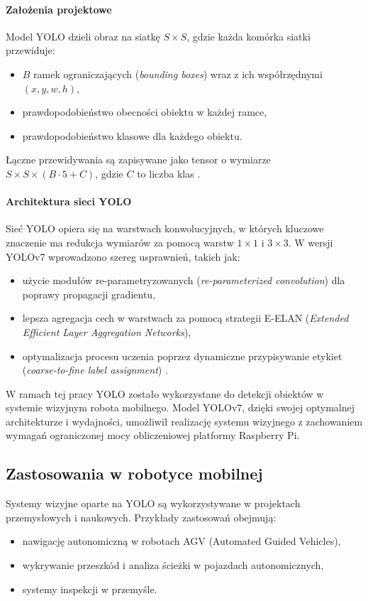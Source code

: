 \documentclass[a4paper,twoside,12pt]{book}
\begin{document}
\paragraph{Założenia projektowe}
Model YOLO dzieli obraz na siatkę \( S \times S \), gdzie każda komórka siatki przewiduje:
\begin{itemize}
    \item \( B \) ramek ograniczających (\textit{bounding boxes}) wraz z ich współrzędnymi \((x, y, w, h)\),
    \item prawdopodobieństwo obecności obiektu w każdej ramce,
    \item prawdopodobieństwo klasowe dla każdego obiektu.
\end{itemize}
Łączne przewidywania są zapisywane jako tensor o wymiarze \( S \times S \times (B \cdot 5 + C) \), gdzie \( C \) to liczba klas \cite{bib:redmon_yolo}.

\paragraph{Architektura sieci YOLO}
Sieć YOLO opiera się na warstwach konwolucyjnych, w których kluczowe znaczenie ma redukcja wymiarów za pomocą warstw \( 1 \times 1 \) i \( 3 \times 3 \). W wersji YOLOv7 wprowadzono szereg usprawnień, takich jak:
\begin{itemize}
    \item użycie modułów re-parametryzowanych (\textit{re-parameterized convolution}) dla poprawy propagacji gradientu,
    \item lepsza agregacja cech w warstwach za pomocą strategii E-ELAN (\textit{Extended Efficient Layer Aggregation Networks}),
    \item optymalizacja procesu uczenia poprzez dynamiczne przypisywanie etykiet (\textit{coarse-to-fine label assignment}) \cite{bib:wang_yolov7}.
\end{itemize}

W ramach tej pracy YOLO zostało wykorzystane do detekcji obiektów w systemie wizyjnym robota mobilnego. Model YOLOv7, dzięki swojej optymalnej architekturze i wydajności, umożliwił realizację systemu wizyjnego z zachowaniem wymagań ograniczonej mocy obliczeniowej platformy Raspberry Pi.

\subsection{Zastosowania w robotyce mobilnej}
Systemy wizyjne oparte na YOLO są wykorzystywane w projektach przemysłowych i naukowych. Przykłady zastosowań obejmują:
\begin{itemize}
    \item nawigację autonomiczną w robotach AGV (Automated Guided Vehicles),
    \item wykrywanie przeszkód i analiza ścieżki w pojazdach autonomicznych,
    \item systemy inspekcji w przemyśle.
\end{itemize}
\end{document}
